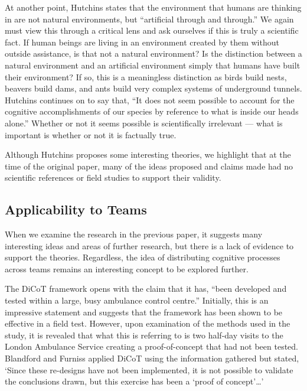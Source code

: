 At another point, Hutchins states that the environment that humans are thinking in are not natural environments, but ``artificial through and through.''\cite{hutchins2000distributed} We again must view this through a critical lens and ask ourselves if this is truly a scientific fact. If human beings are living in an environment created by them without outside assistance, is that not a natural environment? Is the distinction between a natural environment and an artificial environment simply that humans have built their environment? If so, this is a meaningless distinction as birds build nests, beavers build dams, and ants build very complex systems of underground tunnels. Hutchins continues on to say that, ``It does not seem possible to account for the cognitive accomplishments of our species by reference to what is inside our heads alone.''\cite{hutchins2000distributed} Whether or not it seems possible is scientifically irrelevant --- what is important is whether or not it is factually true.

Although Hutchins proposes some interesting theories, we highlight that at the time of the original paper, many of the ideas proposed and claims made had no scientific references or field studies to support their validity.

\subsection{Applicability to Teams}
When we examine the research in the previous paper, it suggests many interesting ideas and areas of further research, but there is a lack of evidence to support the theories. Regardless, the idea of distributing cognitive processes across teams remains an interesting concept to be explored further.

The DiCoT framework opens with the claim that it has, ``been developed and tested within a large, busy ambulance control centre.''\cite{blandford2005dicot} Initially, this is an impressive statement and suggests that the framework has been shown to be effective in a field test. However, upon examination of the methods used in the study, it is revealed that what this is referring to is two half-day visits to the London Ambulance Service creating a proof-of-concept that had not been tested. Blandford and Furniss applied DiCoT using the information gathered but stated, `Since these re-designs have not been implemented, it is not possible to validate the conclusions drawn, but this exercise has been a `proof of concept'\dots'\cite{blandford2005dicot}

